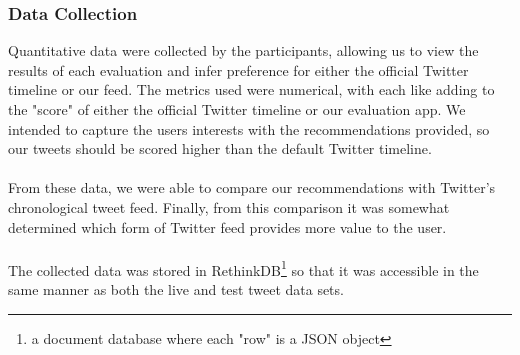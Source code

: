 \documentclass{article}
\begin{document}
\subsubsection*{Data Collection} %
%
%

Quantitative data were collected by the participants, allowing us to view the results of each evaluation and infer preference for either the official Twitter timeline or our feed. The metrics used were numerical, with each like adding to the "score" of either the official Twitter timeline or our evaluation app. We intended to capture the users interests with the recommendations provided, so our tweets should be scored higher than the default Twitter timeline.
\\\\
From these data, we were able to compare our recommendations with Twitter's chronological tweet feed. Finally, from this comparison it was somewhat determined which form of Twitter feed provides more value to the user. 
\\\\
The collected data was stored in RethinkDB\footnote{a document database where each "row" is a JSON object} so that it was accessible in the same manner as both the live and test tweet data sets.
\end{document}
